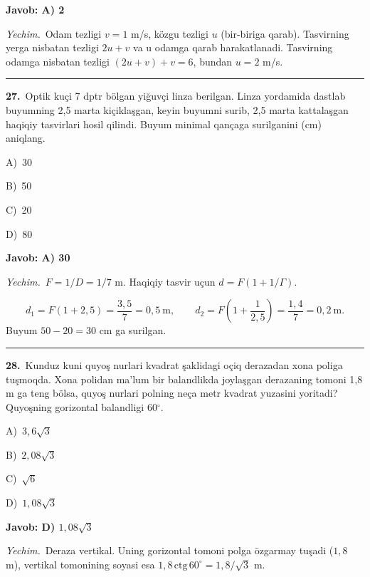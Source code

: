 \documentclass[11pt,a4paper]{article}
\newcommand{\opt}[2]{\hspace*{4mm}#1)\ #2\par}
\begin{document}
\noindent\colorbox{gray!12}{\parbox{\dimexpr\linewidth-2\fboxsep}{\textbf{Javob: A) 2}}}\par\smallskip
\noindent\textit{Yechim.}\ Odam tezligi $v=1$ m/s, közgu tezligi $u$ (bir-biriga qarab). Tasvirning yerga nisbatan tezligi $2u+v$ va u odamga qarab harakatlanadi. Tasvirning odamga nisbatan tezligi $(2u+v)+v=6$, bundan $u=2$ m/s.\par\par\medskip\hrule\medskip
{}\noindent\begin{minipage}{\linewidth}
\textbf{27.}\ Optik kuçi 7 dptr bölgan yiğuvçi linza berilgan. Linza yordamida dastlab buyumning 2,5 marta kiçiklaşgan, keyin buyumni surib, 2,5 marta kattalaşgan haqiqiy tasvirlari hosil qilindi. Buyum minimal qançaga surilganini (cm) aniqlang.\par\smallskip
\opt{A}{30}
\opt{B}{50}
\opt{C}{20}
\opt{D}{80}
\end{minipage}\vspace{2pt}\par
\noindent\colorbox{gray!12}{\parbox{\dimexpr\linewidth-2\fboxsep}{\textbf{Javob: A) 30}}}\par\smallskip
\noindent\textit{Yechim.}\ $F=1/D=1/7$ m. Haqiqiy tasvir uçun $d=F(1+1/\Gamma)$.\par
\[d_1=F(1+2{,}5)=\frac{3{,}5}{7}=0{,}5\ \text{m},\qquad d_2=F\left(1+\frac{1}{2{,}5}\right)=\frac{1{,}4}{7}=0{,}2\ \text{m}.\]
Buyum $50-20=30$ cm ga surilgan.\par\par\medskip\hrule\medskip
{}\noindent\begin{minipage}{\linewidth}
\textbf{28.}\ Kunduz kuni quyoş nurlari kvadrat şaklidagi oçiq derazadan xona poliga tuşmoqda. Xona polidan ma’lum bir balandlikda joylaşgan derazaning tomoni 1,8 m ga teng bölsa, quyoş nurlari polning neça metr kvadrat yuzasini yoritadi? Quyoşning gorizontal balandligi 60$^\circ$.\par\smallskip
\opt{A}{$3{,}6\sqrt3$}
\opt{B}{$2{,}08\sqrt3$}
\opt{C}{$\sqrt6$}
\opt{D}{$1{,}08\sqrt3$}
\end{minipage}\vspace{2pt}\par
\noindent\colorbox{gray!12}{\parbox{\dimexpr\linewidth-2\fboxsep}{\textbf{Javob: D) $1{,}08\sqrt3$}}}\par\smallskip
\noindent\textit{Yechim.}\ Deraza vertikal. Uning gorizontal tomoni polga özgarmay tuşadi ($1{,}8$ m), vertikal tomonining soyasi esa $1{,}8\,\mathrm{ctg}\,60^\circ=1{,}8/\sqrt3$ m.\par
\end{document}
